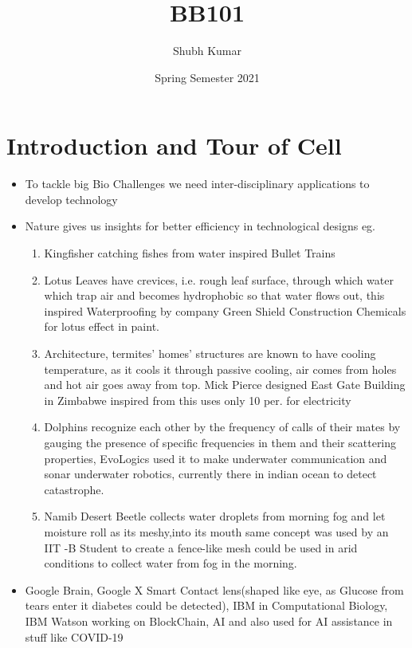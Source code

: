 \documentclass{article}
\title{\textbf{BB101}}
\author{Shubh Kumar}
\date{Spring Semester 2021}
\begin{document}
\maketitle

\section{Introduction and Tour of Cell}
\begin{itemize}
    \item To tackle big Bio Challenges we need inter-disciplinary applications to develop technology
    \item Nature gives us insights for better efficiency in technological designs eg.
    \begin{enumerate}
        \item Kingfisher catching fishes from water inspired Bullet Trains
        \item Lotus Leaves have crevices, i.e. rough leaf surface, through which water which trap air and becomes hydrophobic so that water flows out, this inspired Waterproofing by company Green Shield Construction Chemicals for lotus effect in paint.
        \item Architecture, termites' homes' structures are known to have cooling temperature, as it cools it through passive cooling, air comes from holes and hot air goes away from top. Mick Pierce designed East Gate Building in Zimbabwe inspired from this uses only 10 per. for electricity
        \item  Dolphins recognize each other by the frequency of calls of their mates by gauging the presence of specific frequencies in them and their scattering properties, EvoLogics used it to make underwater communication and sonar underwater robotics, currently there in indian ocean to detect catastrophe.
        \item Namib Desert Beetle collects water droplets from morning fog and let moisture roll as its meshy,into its mouth same concept was used by an IIT -B Student to create a fence-like mesh could be used in arid conditions to collect water from fog in the morning.
    \end{enumerate}

    \item Google Brain, Google X Smart Contact lens(shaped like eye, as Glucose from tears enter it diabetes could be detected), IBM in Computational Biology, IBM Watson working on BlockChain, AI and also used for AI assistance in stuff like COVID-19


\end{itemize}
\end{document}
